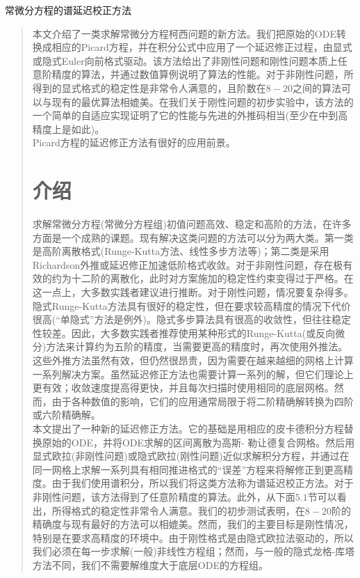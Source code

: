 \documentclass{article}
\begin{document}
\begin{CJK}{UTF8}{gkai}
\begin{center}
\huge{常微分方程的谱延迟校正方法}
\end{center}

\begin{quotation}


本文介绍了一类求解常微分方程柯西问题的新方法。我们把原始的ODE转换成相应的Picard方程，并在积分公式中应用了一个延迟修正过程，由显式或隐式Euler向前格式驱动。该方法给出了非刚性问题和刚性问题本质上任意阶精度的算法，并通过数值算例说明了算法的性能。对于非刚性问题，所得到的显式格式的稳定性是非常令人满意的，且阶数在$8-20$之间的算法可以与现有的最优算法相媲美。在我们关于刚性问题的初步实验中，该方法的一个简单的自适应实现证明了它的性能与先进的外推码相当(至少在中到高精度上是如此)。\\

Picard方程的延迟修正方法有很好的应用前景。\\
\section{介绍}


求解常微分方程(常微分方程组)初值问题高效、稳定和高阶的方法，在许多方面是一个成熟的课题。现有解决这类问题的方法可以分为两大类。第一类是高阶离散格式(Runge-Kutta方法、线性多步方法等)；第二类是采用Richardson外推或延迟修正加速低阶格式收敛。对于非刚性问题，存在极有效的约为十二阶的离散化，此时对方案施加的稳定性约束变得过于严格。在这一点上，大多数实践者建议进行推断。对于刚性问题，情况要复杂得多。隐式Runge-Kutta方法具有很好的稳定性，但在要求较高精度的情况下代价很高(“单隐式”方法是例外)。隐式多步算法具有很高的收敛性，但往往稳定性较差。因此，大多数实践者推荐使用某种形式的Runge-Kutta(或反向微分)方法来计算约为五阶的精度，当需要更高的精度时，再次使用外推法。这些外推方法虽然有效，但仍然很昂贵，因为需要在越来越细的网格上计算一系列解决方案。虽然延迟修正方法也需要计算一系列的解，但它们理论上更有效；收敛速度提高得更快，并且每次扫描时使用相同的底层网格。然而，由于各种数值的影响，它们的应用通常局限于将二阶精确解转换为四阶或六阶精确解。\\

本文提出了一种新的延迟修正方法。它的基础是用相应的皮卡德积分方程替换原始的ODE，并将ODE求解的区间离散为高斯- 勒让德复合网格。然后用显式欧拉(非刚性问题)或隐式欧拉(刚性问题)近似求解积分方程，并通过在同一网格上求解一系列具有相同推进格式的“误差”方程来将解修正到更高精度。由于我们使用谱积分，所以我们将这类方法称为谱延迟校正方法。对于非刚性问题，该方法得到了任意阶精度的算法。此外，从下面$5.1$节可以看出，所得格式的稳定性非常令人满意。我们的初步测试表明，在$8-20$阶的精确度与现有最好的方法可以相媲美。然而，我们的主要目标是刚性情况，特别是在要求高精度的环境中。由于刚性格式是由隐式欧拉法驱动的，所以我们必须在每一步求解(一般)非线性方程组；然而，与一般的隐式龙格-库塔方法不同，我们不需要解维度大于底层ODE的方程组。\\


\end{quotation}
\end{CJK}
\end{document}
